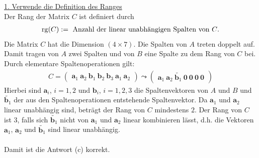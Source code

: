 \underline{1. Verwende die Definition des Ranges}\\
Der Rang der Matrix $ C $ ist definiert durch
\begin{align*}
	\mathrm{rg}(C) := \ \text{Anzahl der linear unabhängigen Spalten von $ C $}.
\end{align*}
Die Matrix $ C $ hat die Dimension $ (4 \times 7) $. Die Spalten von $ A $ treten doppelt auf. Damit tragen von $ A $ zwei Spalten und von $ B $ eine Spalte zu dem Rang von $ C $ bei. Durch elementare Spaltenoperationen gilt:
\begin{align*}
	C = \begin{pmatrix}
		\textbf{a}_1 \ \textbf{a}_2  \
		\textbf{b}_1  \ \textbf{b}_2 \ \textbf{b}_3 \
		\textbf{a}_1  \ \textbf{a}_2
	\end{pmatrix}
\leadsto
	\begin{pmatrix}
		\textbf{a}_1 \ \textbf{a}_2 \ 
		\tilde{\textbf{b}_1} \ \textbf{0} \  \textbf{0} \
		\textbf{0} \ \textbf{0}
	\end{pmatrix}
\end{align*}
Hierbei sind $ \textbf{a}_i $, $ i = 1,2 $ und $ \textbf{b}_i $, $ i = 1,2,3 $ die Spaltenvektoren von $ A $ und $ B $ und $ \tilde{\textbf{b}_1} $ der aus den Spaltenoperationen entstehende Spaltenvektor. 
Da $ \textbf{a}_1 $ und $ \textbf{a}_2 $ linear unabhängig sind, beträgt der Rang von $ C $ mindestens $ 2 $. Der Rang von $ C $ ist $ 3 $, falls sich $ \tilde{\textbf{b}_1} $ nicht von $ \textbf{a}_1 $ und $ \textbf{a}_2 $ linear kombinieren lässt, d.h. die Vektoren $ \textbf{a}_1 $, $ \textbf{a}_2 $ und $ \tilde{\textbf{b}_1} $ sind linear unabhängig.\\
\\
Damit ist die Antwort (c) korrekt.

\newpage
